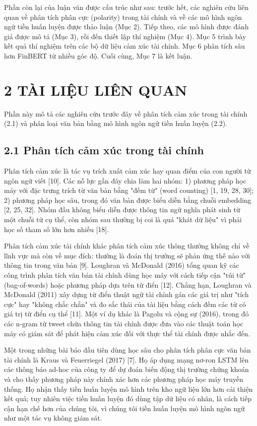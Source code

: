Phần còn lại của luận văn được cấu trúc như sau: trước hết, các nghiên cứu liên quan về phân tích phân cực (polarity) trong tài chính và về các mô hình ngôn ngữ tiền huấn luyện được thảo luận (Mục 2). Tiếp theo, các mô hình được đánh giá được mô tả (Mục 3), rồi đến thiết lập thí nghiệm (Mục 4). Mục 5 trình bày kết quả thí nghiệm trên các bộ dữ liệu cảm xúc tài chính. Mục 6 phân tích sâu hơn FinBERT từ nhiều góc độ. Cuối cùng, Mục 7 là kết luận.

\section{2 TÀI LIỆU LIÊN QUAN}

Phần này mô tả các nghiên cứu trước đây về phân tích cảm xúc trong tài chính (2.1) và phân loại văn bản bằng mô hình ngôn ngữ tiền huấn luyện (2.2).

\subsection{2.1 Phân tích cảm xúc trong tài chính}

Phân tích cảm xúc là tác vụ trích xuất cảm xúc hay quan điểm của con người từ ngôn ngữ viết {[}10{]}. Các nỗ lực gần đây chia làm hai nhóm: 1) phương pháp học máy với đặc trưng trích từ văn bản bằng "đếm từ" (word counting) {[}1, 19, 28, 30{]}; 2) phương pháp học sâu, trong đó văn bản được biểu diễn bằng chuỗi embedding {[}2, 25, 32{]}. Nhóm đầu không biểu diễn được thông tin ngữ nghĩa phát sinh từ một chuỗi từ cụ thể, còn nhóm sau thường bị coi là quá "khát dữ liệu" vì phải học số tham số lớn hơn nhiều {[}18{]}.

Phân tích cảm xúc tài chính khác phân tích cảm xúc thông thường không chỉ về lĩnh vực mà còn về mục đích: thường là đoán thị trường sẽ phản ứng thế nào với thông tin trong văn bản {[}9{]}. Loughran và McDonald (2016) tổng quan kỹ các công trình phân tích văn bản tài chính dùng học máy với cách tiếp cận "túi từ" (bag-of-words) hoặc phương pháp dựa trên từ điển {[}12{]}. Chẳng hạn, Loughran và McDonald (2011) xây dựng từ điển thuật ngữ tài chính gán các giá trị như "tích cực" hay "không chắc chắn" và đo sắc thái của tài liệu bằng cách đếm các từ có giá trị từ điển cụ thể {[}11{]}. Một ví dụ khác là Pagolu và cộng sự (2016), trong đó các n-gram từ tweet chứa thông tin tài chính được đưa vào các thuật toán học máy có giám sát để phát hiện cảm xúc đối với thực thể tài chính được nhắc đến.

Một trong những bài báo đầu tiên dùng học sâu cho phân tích phân cực văn bản tài chính là Kraus và Feuerriegel (2017) {[}7{]}. Họ áp dụng mạng nơ-ron LSTM lên các thông báo ad-hoc của công ty để dự đoán biến động thị trường chứng khoán và cho thấy phương pháp này chính xác hơn các phương pháp học máy truyền thống. Họ nhận thấy tiền huấn luyện mô hình trên kho ngữ liệu lớn hơn cải thiện kết quả; tuy nhiên việc tiền huấn luyện đó dùng tập dữ liệu có nhãn, là cách tiếp cận hạn chế hơn của chúng tôi, vì chúng tôi tiền huấn luyện mô hình ngôn ngữ như một tác vụ không giám sát.

